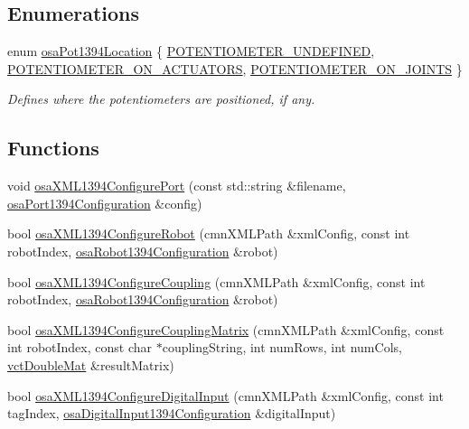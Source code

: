 \subsection*{Enumerations}
\begin{DoxyCompactItemize}
\item 
enum \hyperlink{namespacesaw_robot_i_o1394_a9d63d89648f679b6af5cf3f16576bde9}{osa\+Pot1394\+Location} \{ \hyperlink{namespacesaw_robot_i_o1394_a9d63d89648f679b6af5cf3f16576bde9a7b7ee7cf7008c6c75526a64b7c7e7ed2}{P\+O\+T\+E\+N\+T\+I\+O\+M\+E\+T\+E\+R\+\_\+\+U\+N\+D\+E\+F\+I\+N\+E\+D}, 
\hyperlink{namespacesaw_robot_i_o1394_a9d63d89648f679b6af5cf3f16576bde9a608b055081dce70b7bdd2aaa970b2f9a}{P\+O\+T\+E\+N\+T\+I\+O\+M\+E\+T\+E\+R\+\_\+\+O\+N\+\_\+\+A\+C\+T\+U\+A\+T\+O\+R\+S}, 
\hyperlink{namespacesaw_robot_i_o1394_a9d63d89648f679b6af5cf3f16576bde9a03bb052c9f73c37f3112cbc6af250398}{P\+O\+T\+E\+N\+T\+I\+O\+M\+E\+T\+E\+R\+\_\+\+O\+N\+\_\+\+J\+O\+I\+N\+T\+S}
 \}
\begin{DoxyCompactList}\small\item\em Defines where the potentiometers are positioned, if any. \end{DoxyCompactList}\end{DoxyCompactItemize}
\subsection*{Functions}
\begin{DoxyCompactItemize}
\item 
void \hyperlink{namespacesaw_robot_i_o1394_a8b63d179d862acce1acc0c70eb9fc57b}{osa\+X\+M\+L1394\+Configure\+Port} (const std\+::string \&filename, \hyperlink{structsaw_robot_i_o1394_1_1osa_port1394_configuration}{osa\+Port1394\+Configuration} \&config)
\item 
bool \hyperlink{namespacesaw_robot_i_o1394_a0c7d844d6fc4e4a9b24b96e1062fe055}{osa\+X\+M\+L1394\+Configure\+Robot} (cmn\+X\+M\+L\+Path \&xml\+Config, const int robot\+Index, \hyperlink{structsaw_robot_i_o1394_1_1osa_robot1394_configuration}{osa\+Robot1394\+Configuration} \&robot)
\item 
bool \hyperlink{namespacesaw_robot_i_o1394_ad2d50cafd06a531000af16cc21244ec9}{osa\+X\+M\+L1394\+Configure\+Coupling} (cmn\+X\+M\+L\+Path \&xml\+Config, const int robot\+Index, \hyperlink{structsaw_robot_i_o1394_1_1osa_robot1394_configuration}{osa\+Robot1394\+Configuration} \&robot)
\item 
bool \hyperlink{namespacesaw_robot_i_o1394_a0449ee65c8c8bc66d6091a7ea81d05d4}{osa\+X\+M\+L1394\+Configure\+Coupling\+Matrix} (cmn\+X\+M\+L\+Path \&xml\+Config, const int robot\+Index, const char $\ast$coupling\+String, int num\+Rows, int num\+Cols, \hyperlink{vct_dynamic_matrix_types_8h_a48f1eb2461d20a99e824ee5753a37c84}{vct\+Double\+Mat} \&result\+Matrix)
\item 
bool \hyperlink{namespacesaw_robot_i_o1394_ab3de8ee2619a30a56d58662cef87e0c8}{osa\+X\+M\+L1394\+Configure\+Digital\+Input} (cmn\+X\+M\+L\+Path \&xml\+Config, const int tag\+Index, \hyperlink{structsaw_robot_i_o1394_1_1osa_digital_input1394_configuration}{osa\+Digital\+Input1394\+Configuration} \&digital\+Input)
\end{DoxyCompactItemize}
